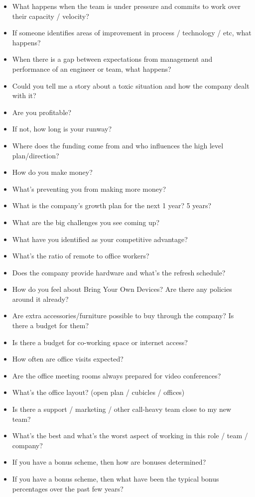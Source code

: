 \documentclass{article}
\begin{document}
\begin{itemize}
\item What happens when the team is under pressure and commits to work over their capacity / velocity?
\item If someone identifies areas of improvement in process / technology / etc, what happens?
\item When there is a gap between expectations from management and performance of an engineer or team, what happens?
\item Could you tell me a story about a toxic situation and how the company dealt with it?
\item Are you profitable?
\item If not, how long is your runway?
\item Where does the funding come from and who influences the high level plan/direction?
\item How do you make money?
\item What's preventing you from making more money?
\item What is the company's growth plan for the next 1 year? 5 years?
\item What are the big challenges you see coming up?
\item What have you identified as your competitive advantage?
\item What's the ratio of remote to office workers?
\item Does the company provide hardware and what's the refresh schedule?
\item How do you feel about Bring Your Own Devices? Are there any policies around it already?
\item Are extra accessories/furniture possible to buy through the company? Is there a budget for them?
\item Is there a budget for co-working space or internet access?
\item How often are office visits expected?
\item Are the office meeting rooms always prepared for video conferences?
\item What's the office layout? (open plan / cubicles / offices)
\item Is there a support / marketing / other call-heavy team close to my new team?
\item What's the best and what's the worst aspect of working in this role / team / company?
\item If you have a bonus scheme, then how are bonuses determined?
\item If you have a bonus scheme, then what have been the typical bonus percentages over the past few years?

\end{itemize}
\end{document}
